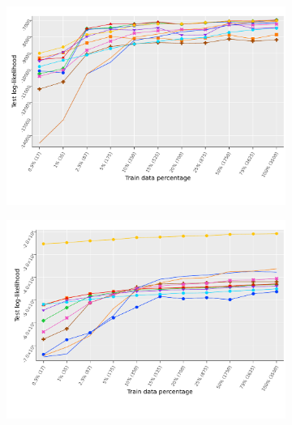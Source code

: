 \begin{figure}
\begin{subfigure}[b]{0.495\textwidth}
    \caption{}
  \end{subfigure}\\ 
  \begin{subfigure}[b]{0.495\textwidth}
    \centering\includegraphics[width=\textwidth]{supplementary/all_ll_sushi_choose_ensembles.pdf}
    \caption{}
  \end{subfigure}
  \begin{subfigure}[b]{0.495\textwidth}
    \centering\includegraphics[width=\textwidth]{supplementary/all_ll_sushi_ranking_ensembles.pdf}
    \caption{}
  \end{subfigure}\\
  \begin{subfigure}[t]{0.495\textwidth}

\end{subfigure}
\end{figure}
